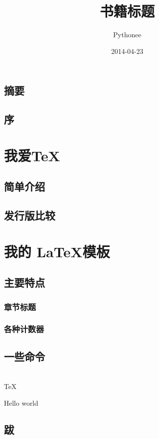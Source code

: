 \documentclass[fancyhdr,adobefonts,oneside,hyperref,openany,a4paper,UTF8]{ctexbook}
\author{Pythonee}
\title{书籍标题}
\date{2014-04-23}
\begin{document}
\maketitle


\frontmatter
\tableofcontents
\listoftables
\listoffigures
\setcounter{page}{0}
\chapter{摘要}
\lipsum[1]
\chapter{序}
\lipsum[1]


\mainmatter
\part{我爱\TeX}
\chapter{简单介绍}
\lipsum

\chapter{发行版比较}
\lipsum

\part{我的 \LaTeX 模板}
\chapter{主要特点}
\section{章节标题}
\lipsum
\section{各种计数器}
\lipsum

\chapter{一些命令}
\cpp \\
\TeX \cite{knuth,lamport}

Hello  world


\backmatter
\chapter{跋}
\lipsum[1]

\appendix



\printindex

\end{document}

